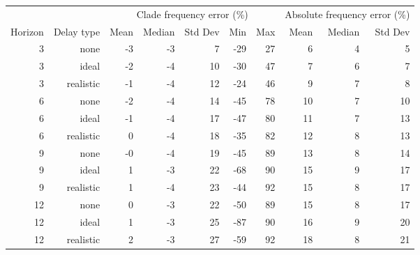 
\begin{tabular*}{1.0\textwidth}{rrrrrrrrrr}
\toprule
        &            & \multicolumn{5}{c}{Clade frequency error (\%)} & \multicolumn{3}{c}{Absolute frequency error (\%)} \\
Horizon & Delay type & Mean & Median & Std Dev & Min & Max & Mean & Median & Std Dev \\
\midrule

3 & none & -3 & -3 & 7 & -29 & 27 & 6 & 4 & 5 \\
3 & ideal & -2 & -4 & 10 & -30 & 47 & 7 & 6 & 7 \\
3 & realistic & -1 & -4 & 12 & -24 & 46 & 9 & 7 & 8 \\
6 & none & -2 & -4 & 14 & -45 & 78 & 10 & 7 & 10 \\
6 & ideal & -1 & -4 & 17 & -47 & 80 & 11 & 7 & 13 \\
6 & realistic & 0 & -4 & 18 & -35 & 82 & 12 & 8 & 13 \\
9 & none & -0 & -4 & 19 & -45 & 89 & 13 & 8 & 14 \\
9 & ideal & 1 & -3 & 22 & -68 & 90 & 15 & 9 & 17 \\
9 & realistic & 1 & -4 & 23 & -44 & 92 & 15 & 8 & 17 \\
12 & none & 0 & -3 & 22 & -50 & 89 & 15 & 8 & 17 \\
12 & ideal & 1 & -3 & 25 & -87 & 90 & 16 & 9 & 20 \\
12 & realistic & 2 & -3 & 27 & -59 & 92 & 18 & 8 & 21 \\

\bottomrule
\end{tabular*}

